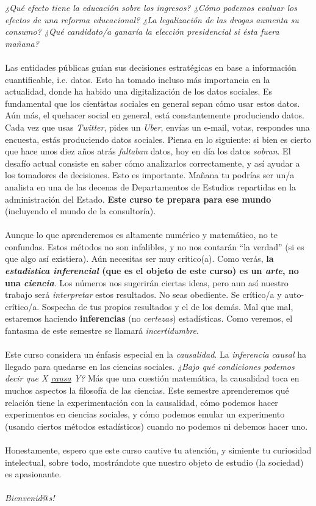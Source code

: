 \documentclass[letterpaper]{article}
\begin{document}
\emph{¿Qu\'e efecto tiene la educaci\'on sobre los ingresos? ¿C\'omo podemos evaluar los efectos de una reforma educacional? ¿La legalizaci\'on de las drogas aumenta su consumo? ¿Qu\'e candidato/a ganar\'ia la elecci\'on presidencial si \'esta fuera ma\~nana?} 
\\
\\
Las entidades p\'ublicas gu\'ian sus decisiones estrat\'egicas en base a informaci\'on cuantificable, i.e. datos. Esto ha tomado incluso m\'as importancia en la actualidad, donde ha habido una digitalizaci\'on de los datos sociales. Es fundamental que los cientistas sociales en general sepan c\'omo usar estos datos. A\'un m\'as, el quehacer social en general, est\'a constantemente produciendo datos. Cada vez que usas \emph{Twitter}, pides un \emph{Uber}, env\'ias un e-mail, votas, respondes una encuesta, est\'as produciendo datos sociales. Piensa en lo siguiente: si bien es cierto que hace unos diez a\~nos atr\'as \emph{faltaban} datos, hoy en d\'ia los datos \emph{sobran}. El desaf\'io actual consiste en saber c\'omo analizarlos correctamente, y as\'i ayudar a los tomadores de decisiones. Esto es importante. Ma\~nana tu podr\'ias ser un/a analista en una de las decenas de Departamentos de Estudios repartidas en la administraci\'on del Estado. {\bf Este curso te prepara para ese mundo} (incluyendo el mundo de la consultor\'ia).
\\
\\
Aunque lo que aprenderemos es altamente num\'erico y matem\'atico, no te confundas. Estos m\'etodos no son infalibles, y no nos contar\'an ``la verdad'' (si es que algo as\'i existiera). A\'un necesitas ser muy critico(a). Como ver\'as, {\bf la \emph{estad\'istica inferencial} (que es el objeto de este curso) es un \emph{arte}, no una \emph{ciencia}}. Los n\'umeros nos sugerir\'an ciertas ideas, pero aun as\'i nuestro trabajo ser\'a \emph{interpretar} estos resultados. No seas obediente. Se cr\'itico/a y auto-cr\'itico/a. Sospecha de tus propios resultados y el de los dem\'as. Mal que mal, estaremos haciendo {\bf inferencias} (no \emph{certezas}) estad\'isticas. Como veremos, el fantasma de este semestre se llamar\'a \emph{incertidumbre}. 
\\
\\
Este curso considera un \'enfasis especial en la \emph{causalidad}. La \emph{inferencia causal} ha llegado para quedarse en las ciencias sociales. \emph{¿Bajo qu\'e condiciones podemos decir que X \underline{causa} Y?} M\'as que una cuesti\'on matem\'atica, la causalidad toca en muchos aspectos la filosof\'ia de las ciencias. Este semestre aprenderemos qu\'e relaci\'on tiene la experimentaci\'on con la causalidad, c\'omo podemos hacer experimentos en ciencias sociales, y c\'omo podemos emular un experimento (usando ciertos m\'etodos estad\'isticos) cuando no podemos ni debemos hacer uno.
\\
\\
Honestamente, espero que este curso cautive tu atenci\'on, y simiente tu curiosidad intelectual, sobre todo, mostr\'andote que nuestro objeto de estudio (la sociedad) es apasionante. 
\\
\\
\emph{Bienvenid$@$s!}
\end{document}
